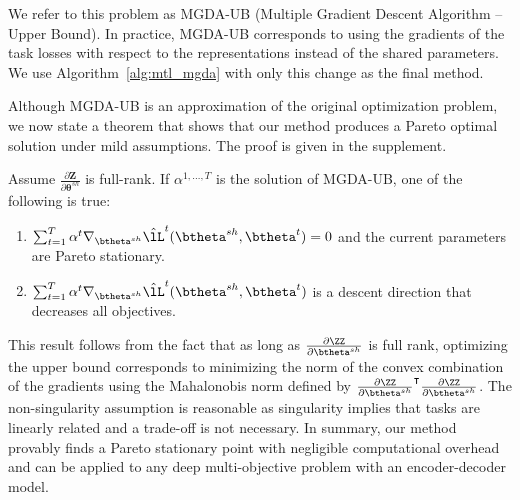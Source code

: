 We refer to this problem as MGDA-UB (Multiple Gradient Descent Algorithm -- Upper Bound). In practice, MGDA-UB corresponds to using the gradients of the task losses with respect to the representations instead of the shared parameters. We use Algorithm~\ref{alg:mtl_mgda} with only this change as the final method.

Although MGDA-UB is an approximation of the original optimization problem, we now state a theorem that shows that our method produces a Pareto optimal solution under mild assumptions. The proof is given in the supplement.

\begin{theorem}
Assume $\frac{\partial \mathbf{Z}}{\partial \mathbf{\theta}^{sh}}$ is full-rank. If $\alpha^{1,\ldots,T}$ is the solution of MGDA-UB, one of the following is true:
\begin{enumerate}[ topsep=0pt, label=\emph{(\alph*)},align=left,leftmargin=*]
\item $\sum_{t=1}^T \alpha^t \nabla_{\btheta^{sh}}  \hat{\lL}^t(\btheta^{sh},\btheta^t)=0$ and the current parameters are Pareto stationary.
\item $\sum_{t=1}^T \alpha^t \nabla_{\btheta^{sh}}  \hat{\lL}^t(\btheta^{sh},\btheta^t)$ is a descent direction that decreases all objectives.
\end{enumerate}
\label{thm}
\end{theorem}

This result follows from the fact that as long as $\frac{\partial \ZZ}{\partial \btheta^{sh}}$ is full rank, optimizing the upper bound corresponds to minimizing the norm of the convex combination of the gradients using the Mahalonobis norm defined by $\frac{\partial \ZZ}{\partial \btheta^{sh}}^\intercal \frac{\partial \ZZ}{\partial \btheta^{sh}}$. The non-singularity assumption is reasonable as singularity implies that tasks are linearly related and a trade-off is not necessary. In summary, our method provably finds a Pareto stationary point with negligible computational overhead and can be applied to any deep multi-objective problem with an encoder-decoder model.
